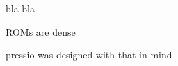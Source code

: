 bla bla


\begin{DoxyItemize}
\item ROMs are dense
\item pressio was designed with that in mind 
\end{DoxyItemize}